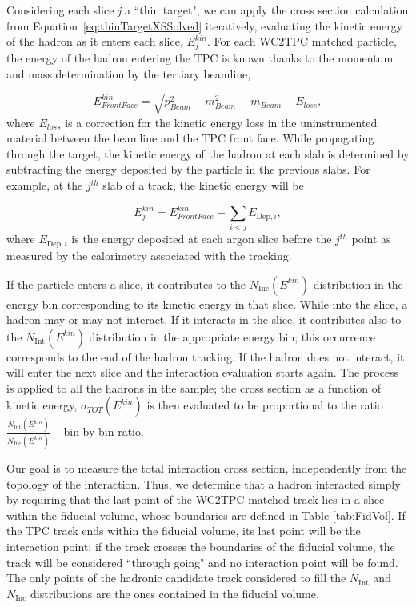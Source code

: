 Considering each slice {\emph{j}}  a ``thin target",  we can apply the cross section calculation from Equation~\ref{eq:thinTargetXSSolved} iteratively, evaluating the kinetic energy of the hadron as it enters each slice, $E_{j}^{kin}$.  For each WC2TPC matched particle, the energy of the hadron entering the TPC is known thanks to the momentum and mass determination by the tertiary beamline, 

\begin{equation}
 E^{kin}_{Front Face}  = \sqrt{p^2_{Beam} - m^2_{Beam}} - m_{Beam} - E_{loss},
\label{eq:enFF}
\end{equation}
where $E_{loss}$ is a correction for the kinetic energy loss in the uninstrumented material between the beamline and the TPC front face. While propagating through the target,  the kinetic energy of the hadron at each slab is determined by subtracting the energy deposited by the particle in the previous slabs. For example, at the $j^{th}$ slab of a track, the kinetic energy will be

\begin{equation}
 E_{j}^{kin} =  E^{kin}_{Front Face} - \sum_{i < j} E_{\text{Dep},i},
\label{eq:KEj}
\end{equation}
where $E_{\text{Dep},i}$ is the energy deposited at each argon slice before the $j^{th}$ point as measured by the calorimetry associated with the tracking.


If the particle enters a slice, it contributes to the $N_{\text{Inc}}( E^{kin})$ distribution in the energy bin corresponding to its kinetic energy in that slice. While into the slice, a hadron may or may not interact. If it interacts in the slice, it  contributes also to the $N_{\text{Int}}(E^{kin})$ distribution in the appropriate energy bin; this occurrence corresponds to the end of the hadron tracking. If the hadron does not interact, it will enter the next slice and the interaction evaluation starts again.
The process is applied to all the hadrons in the sample; the cross section as a function of kinetic energy, $\sigma_{TOT}( E^{kin})$ is then evaluated to be proportional to the ratio $\frac{N_{\text{Int}}( E^{kin})}{N_{\text{Inc}}( E^{kin})}$ -- bin by bin ratio. 


Our goal is to measure the total interaction cross section, independently  from the topology of the interaction. Thus, we determine that a hadron interacted simply by requiring that the last point of the WC2TPC matched track lies in a slice within the fiducial volume, whose boundaries are defined in Table \ref{tab:FidVol}. If the TPC track ends within the fiducial volume, its last point will be the interaction point; if the track crosses the boundaries of the fiducial volume, the track will be considered ``through going" and no interaction point will be found. The only points of the hadronic candidate track considered to fill the  $N_{\text{Int}}$ and  $N_{\text{Inc}}$ distributions are the ones contained in the fiducial volume. 
 
